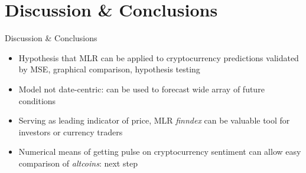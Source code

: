 \documentclass[10pt]{beamer}
\begin{document}
    \section{Discussion \& Conclusions}
    \begin{frame}[fragile]{Discussion \& Conclusions}
        \begin{itemize}
            \item Hypothesis that MLR can be applied to cryptocurrency predictions validated by MSE, graphical comparison, hypothesis testing
            \item Model not date-centric: can be used to forecast wide array of future conditions 
            \item Serving as leading indicator of price, MLR \textit{finndex} can be valuable tool for investors or currency traders
            \item Numerical means of getting pulse on cryptocurrency sentiment can allow easy comparison of \textit{altcoins}: next step
        \end{itemize}
    \end{frame}
    
\end{document}
